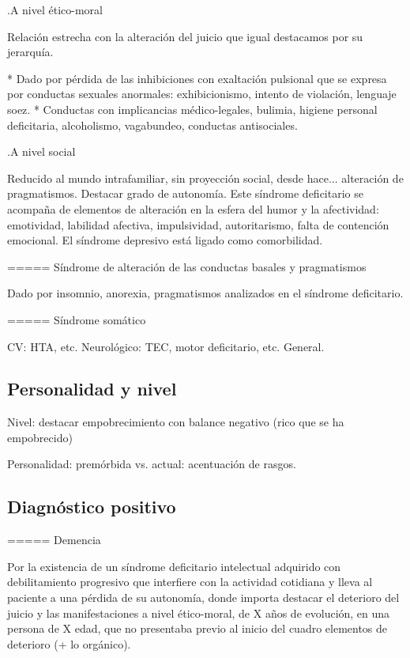 .A nivel ético-moral

Relación estrecha con la alteración del juicio que igual destacamos por su jerarquía.

* Dado por pérdida de las inhibiciones con exaltación pulsional que se expresa por conductas sexuales anormales: exhibicionismo, intento de violación, lenguaje soez.
* Conductas con implicancias médico-legales, bulimia, higiene personal deficitaria, alcoholismo, vagabundeo, conductas antisociales.

.A nivel social

Reducido al mundo intrafamiliar, sin proyección social, desde hace... alteración de pragmatismos. Destacar grado de autonomía. Este síndrome deficitario se acompaña de elementos de alteración en la esfera del humor y la afectividad: emotividad, labilidad afectiva, impulsividad, autoritarismo, falta de contención emocional. El síndrome depresivo está ligado como comorbilidad.

===== Síndrome de alteración de las conductas basales y pragmatismos

Dado por insomnio, anorexia, pragmatismos analizados en el síndrome deficitario.

===== Síndrome somático

CV: HTA, etc. Neurológico: TEC, motor deficitario, etc. General.

\subsection*{Personalidad y nivel}

Nivel: destacar empobrecimiento con balance negativo (rico que se ha empobrecido)

Personalidad: premórbida vs. actual: acentuación de rasgos.

\subsection*{Diagnóstico positivo}

===== Demencia

Por la existencia de un síndrome deficitario intelectual adquirido con debilitamiento progresivo que interfiere con la actividad cotidiana y lleva al paciente a una pérdida de su autonomía, donde importa destacar el deterioro del juicio y las manifestaciones a nivel ético-moral, de X años de evolución, en una persona de X edad, que no presentaba previo al inicio del cuadro elementos de deterioro (+ lo orgánico).

